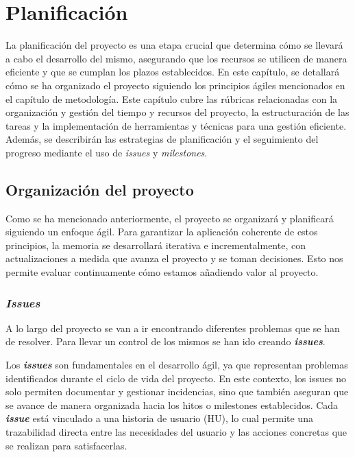 \chapter{Planificación}

La planificación del proyecto es una etapa crucial que determina cómo se llevará a cabo el desarrollo del mismo, asegurando que los recursos se utilicen de manera eficiente y que se cumplan los plazos establecidos. En este capítulo, se detallará cómo se ha organizado el proyecto siguiendo los principios ágiles mencionados en el capítulo de metodología. Este capítulo cubre las rúbricas relacionadas con la organización y gestión del tiempo y recursos del proyecto, la estructuración de las tareas y la implementación de herramientas y técnicas para una gestión eficiente. Además, se describirán las estrategias de planificación y el seguimiento del progreso mediante el uso de \textit{issues} y \textit{milestones}.

\section{Organización del proyecto}

Como se ha mencionado anteriormente, el proyecto se organizará y planificará siguiendo un enfoque ágil. Para garantizar la aplicación coherente de estos principios, la memoria se desarrollará iterativa e incrementalmente, con actualizaciones a medida que avanza el proyecto y se toman decisiones. Esto nos permite evaluar continuamente cómo estamos añadiendo valor al proyecto.

\subsection{\textit{Issues}}

A lo largo del proyecto se van a ir encontrando diferentes problemas que se han de resolver. Para llevar un control de los mismos se han ido creando \textit{\textbf{issues}}. 

Los \textit{\textbf{issues}} son fundamentales en el desarrollo ágil, ya que representan problemas identificados durante el ciclo de vida del proyecto. En este contexto, los issues no solo permiten documentar y gestionar incidencias, sino que también aseguran que se avance de manera organizada hacia los hitos o milestones establecidos. Cada \textit{\textbf{issue}} está vinculado a una historia de usuario (HU), lo cual permite una trazabilidad directa entre las necesidades del usuario y las acciones concretas que se realizan para satisfacerlas.


